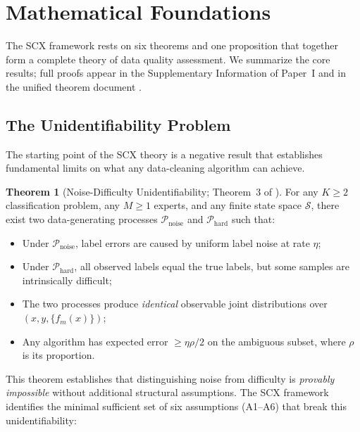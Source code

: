 \documentclass[twocolumn]{article}
\theoremstyle{definition}
\newtheorem{theorem}{Theorem}
\begin{document}
\section{Mathematical Foundations}

The SCX framework rests on six theorems and one proposition that together form a complete theory of data quality assessment. We summarize the core results; full proofs appear in the Supplementary Information of Paper~I \cite{paperI} and in the unified theorem document \cite{theorems_unified}.

\subsection{The Unidentifiability Problem}

The starting point of the SCX theory is a negative result that establishes fundamental limits on what any data-cleaning algorithm can achieve.

\begin{theorem}[Noise-Difficulty Unidentifiability; Theorem~3 of \cite{paperI}]
\label{thm:unidentifiability}
For any $K \geq 2$ classification problem, any $M \geq 1$ experts, and any finite state space $\mathcal{S}$, there exist two data-generating processes $\mathcal{P}_{\text{noise}}$ and $\mathcal{P}_{\text{hard}}$ such that:
\begin{itemize}
  \item Under $\mathcal{P}_{\text{noise}}$, label errors are caused by uniform label noise at rate $\eta$;
  \item Under $\mathcal{P}_{\text{hard}}$, all observed labels equal the true labels, but some samples are intrinsically difficult;
  \item The two processes produce \emph{identical} observable joint distributions over $(x, y, \{f_m(x)\})$;
  \item Any algorithm has expected error $\geq \eta\rho/2$ on the ambiguous subset, where $\rho$ is its proportion.
\end{itemize}
\end{theorem}

This theorem establishes that distinguishing noise from difficulty is \emph{provably impossible} without additional structural assumptions. The SCX framework identifies the minimal sufficient set of six assumptions (A1--A6) that break this unidentifiability:
\end{document}
